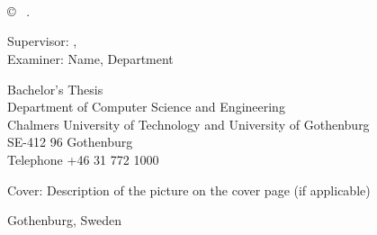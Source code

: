 \newpage
\thispagestyle{plain}
\vspace*{4.5cm}
\oneLineTitle\\
\oneLineSubtitle\\
\MARTINT{} \setlength{\parskip}{1cm}
\FELIXT{} \setlength{\parskip}{1cm}
\HANNEST{} \setlength{\parskip}{1cm}
\\
\MARCUST{} \setlength{\parskip}{1cm}
\JAKOBT{} \setlength{\parskip}{1cm}

\copyright ~ \MEMBERTILDELIST{} \the\year. \setlength{\parskip}{1cm}

Supervisor: \supervisor, \supervisordepartment\\
Examiner: Name, Department \setlength{\parskip}{1cm}

Bachelor's Thesis \the\year\\	%
Department of Computer Science and Engineering\\
Chalmers University of Technology and University of Gothenburg\\
SE-412 96 Gothenburg\\
Telephone +46 31 772 1000 \setlength{\parskip}{0.5cm}

\vfill
Cover: Description of the picture on the cover page (if applicable)


Gothenburg, Sweden \the\year

